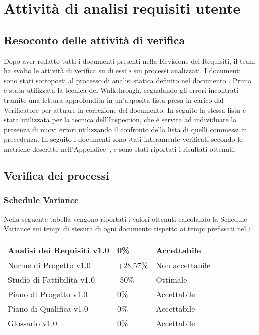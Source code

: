 \newpage
\section{Attività di analisi requisiti utente}
\subsection{Resoconto delle attività di verifica}

Dopo aver redatto tutti i documenti presenti nella Revisione dei Requisiti, il team ha svolto le attività di verifica su di essi e sui processi analizzati. I documenti sono stati sottoposti al processo di analisi statica definito nel documento \NdP{}.
Prima è stata utilizzata la tecnica del Walkthrough, segnalando gli errori incontrati tramite una lettura approfondita in un'apposita lista presa in carico dal Verificatore per attuare la correzione del documento. In seguito la stessa lista è stata utilizzata per la tecnica dell'Inspection, che è servita ad individuare la presenza di nuovi errori utilizzando il confronto della lista di quelli commessi in precedenza.
In seguito i documenti sono stati interamente verificati secondo le metriche descritte nell'Appendice~, e sono stati riportati i risultati ottenuti.

\subsection{Verifica dei processi}
\subsubsection{Schedule Variance}
Nella seguente tabella vengono riportati i valori ottenuti calcolando la Schedule Variance sui tempi di stesura di ogni documento rispetto ai tempi prefissati nel \PdP{}:

{
	\renewcommand{\arraystretch}{2}
	\centering
	\begin{tabular}{| L{4cm} | R{0.5cm} | C{3cm} |}
	\hline
	Analisi dei Requisiti v1.0 & 0\% & Accettabile \\
	\hline
	Norme di Progetto v1.0 & +28,57\% & Non accettabile \\
	\hline
	Studio di Fattibilità v1.0 &  -50\% &  Ottimale \\
	\hline
	Piano di Progetto v1.0 &  0\% &  Accettabile\\
	\hline
	Piano di Qualifica v1.0 & 0\% & Accettabile \\
	\hline
	Glossario v1.0 & 0\% & Accettabile\\	
	\hline
	\end{tabular}
	
}

